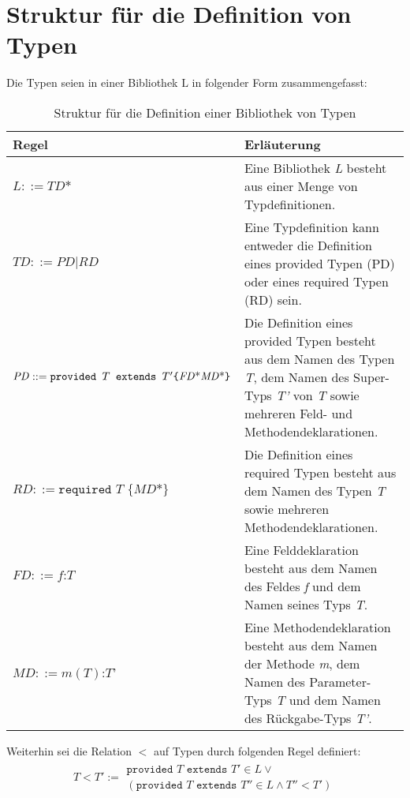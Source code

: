 \documentclass[a4paper,12pt]{article}
\begin{document}
\section{Struktur für die Definition von Typen}
Die Typen seien in einer Bibliothek $\text{L}$ in folgender Form zusammengefasst:
\begin{table}[H]
\centering
\begin{tabular}{|p{5.5cm}|p{8.5cm}|}
\hline
\hline
\centering\textbf{Regel} & \textbf{Erläuterung} \\
\hline
\hline
$\mathit{L} ::= \mathit{TD}\text{*}$ & Eine Bibliothek \emph{L} besteht aus einer Menge von Typdefinitionen.\\
\hline
$\mathit{TD} ::= \mathit{PD} | \mathit{RD}$ & Eine Typdefinition kann entweder die Definition eines provided Typen (PD) oder eines required Typen (RD) sein.\\
\hline
$\mathit{PD} ::= \newline\texttt{provided }T \texttt{ extends } T' \newline  \texttt{\{} \mathit{FD}\text{*} \mathit{MD}\text{*}\texttt{\}}$& Die Definition eines provided Typen besteht aus dem Namen des Typen \emph{T}, dem Namen des Super-Typs \emph{T'} von \emph{T} sowie mehreren Feld- und Methodendeklarationen.\\
\hline
$\mathit{RD} ::= \texttt{required } T \texttt{ \{}\mathit{MD}\text{*}\texttt{\}}$ & Die Definition eines required Typen besteht aus dem Namen des Typen \emph{T} sowie mehreren Methodendeklarationen.\\
\hline
$\mathit{FD} ::= \mathit{f} \texttt{:} T$ & Eine Felddeklaration besteht aus dem Namen des Feldes \emph{f} und dem Namen seines Typs \emph{T}.\\
\hline
$\mathit{MD} ::= \mathit{m(T)}\texttt{:}\mathit{T}$' & Eine Methodendeklaration besteht aus dem Namen der Methode \emph{m}, dem Namen des Parameter-Typs \emph{T} und dem Namen des Rückgabe-Typs \emph{T'}.\\
\hline
\hline
\end{tabular}
\caption{Struktur für die Definition einer Bibliothek von Typen}
 \label{tab:eIShort}
\end{table}
\noindent
Weiterhin sei die Relation $<$ auf Typen durch folgenden Regel definiert:
\begin{gather*}
T < T' := \begin{array}{l}
	\texttt{provided }T \texttt{ extends } T' \in L \vee\\
	(\texttt{provided } T \texttt{ extends } T'' \in L \wedge T'' < T')
		\end{array}
\end{gather*}
\end{document}
